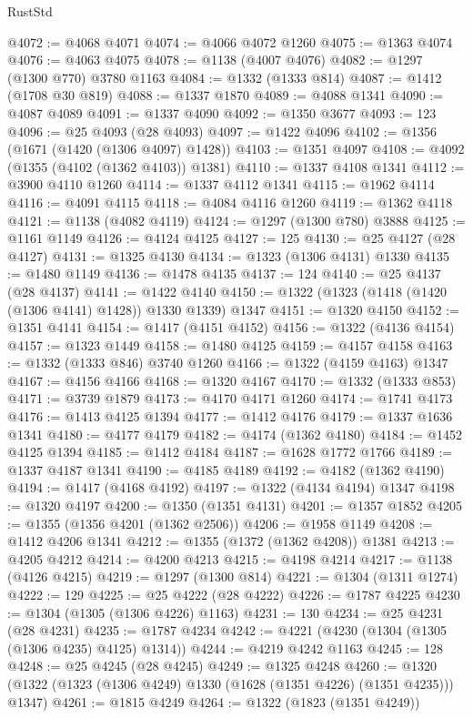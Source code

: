 \begin{lexlean}{RustStd}
\begin{coremodule}
@4072 := @4068 @4071
@4074 := @4066 @4072 @1260
@4075 := @1363 @4074
@4076 := @4063 @4075
@4078 := @1138 (@4007 @4076)
@4082 := @1297 (@1300 @770) @3780 @1163
@4084 := @1332 (@1333 @814)
@4087 := @1412 (@1708 @30 @819)
@4088 := @1337 @1870
@4089 := @4088 @1341
@4090 := @4087 @4089
@4091 := @1337 @4090
@4092 := @1350 @3677
@4093 := 123
@4096 := @25 @4093 (@28 @4093)
@4097 := @1422 @4096
@4102 := @1356 (@1671 (@1420 (@1306 @4097) @1428))
@4103 := @1351 @4097
@4108 := @4092 (@1355 (@4102 (@1362 @4103)) @1381)
@4110 := @1337 @4108 @1341
@4112 := @3900 @4110 @1260
@4114 := @1337 @4112 @1341
@4115 := @1962 @4114
@4116 := @4091 @4115
@4118 := @4084 @4116 @1260
@4119 := @1362 @4118
@4121 := @1138 (@4082 @4119)
@4124 := @1297 (@1300 @780) @3888
@4125 := @1161 @1149
@4126 := @4124 @4125
@4127 := 125
@4130 := @25 @4127 (@28 @4127)
@4131 := @1325 @4130
@4134 := @1323 (@1306 @4131) @1330
@4135 := @1480 @1149
@4136 := @1478 @4135
@4137 := 124
@4140 := @25 @4137 (@28 @4137)
@4141 := @1422 @4140
@4150 := @1322 (@1323 (@1418 (@1420 (@1306 @4141) @1428)) @1330 @1339) @1347
@4151 := @1320 @4150
@4152 := @1351 @4141
@4154 := @1417 (@4151 @4152)
@4156 := @1322 (@4136 @4154)
@4157 := @1323 @1449
@4158 := @1480 @4125
@4159 := @4157 @4158
@4163 := @1332 (@1333 @846) @3740 @1260
@4166 := @1322 (@4159 @4163) @1347
@4167 := @4156 @4166
@4168 := @1320 @4167
@4170 := @1332 (@1333 @853)
@4171 := @3739 @1879
@4173 := @4170 @4171 @1260
@4174 := @1741 @4173
@4176 := @1413 @4125 @1394
@4177 := @1412 @4176
@4179 := @1337 @1636 @1341
@4180 := @4177 @4179
@4182 := @4174 (@1362 @4180)
@4184 := @1452 @4125 @1394
@4185 := @1412 @4184
@4187 := @1628 @1772 @1766
@4189 := @1337 @4187 @1341
@4190 := @4185 @4189
@4192 := @4182 (@1362 @4190)
@4194 := @1417 (@4168 @4192)
@4197 := @1322 (@4134 @4194) @1347
@4198 := @1320 @4197
@4200 := @1350 (@1351 @4131)
@4201 := @1357 @1852
@4205 := @1355 (@1356 @4201 (@1362 @2506))
@4206 := @1958 @1149
@4208 := @1412 @4206 @1341
@4212 := @1355 (@1372 (@1362 @4208)) @1381
@4213 := @4205 @4212
@4214 := @4200 @4213
@4215 := @4198 @4214
@4217 := @1138 (@4126 @4215)
@4219 := @1297 (@1300 @814)
@4221 := @1304 (@1311 @1274)
@4222 := 129
@4225 := @25 @4222 (@28 @4222)
@4226 := @1787 @4225
@4230 := @1304 (@1305 (@1306 @4226) @1163)
@4231 := 130
@4234 := @25 @4231 (@28 @4231)
@4235 := @1787 @4234
@4242 := @4221 (@4230 (@1304 (@1305 (@1306 @4235) @4125) @1314))
@4244 := @4219 @4242 @1163
@4245 := 128
@4248 := @25 @4245 (@28 @4245)
@4249 := @1325 @4248
@4260 := @1320 (@1322 (@1323 (@1306 @4249) @1330 (@1628 (@1351 @4226) (@1351 @4235))) @1347)
@4261 := @1815 @4249
@4264 := @1322 (@1823 (@1351 @4249))

\end{coremodule}
\end{lexlean}
